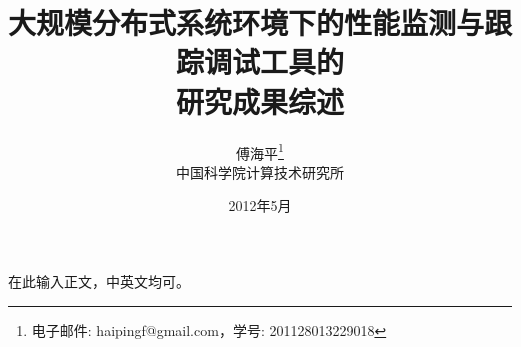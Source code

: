 ﻿\documentclass[a4paper, 11pt]{article}
\newcommand{\xiaosihao}{\fontsize{12pt}{\baselineskip}\selectfont}
\begin{document}
	\begin{CJK}{UTF8}{gbsn}
		
		\newtheorem{example}{例}             %
		\newtheorem{algorithm}{算法}
		\newtheorem{theorem}{定理}[section]  %
		\newtheorem{definition}{定义}
		\newtheorem{axiom}{公理}
		\newtheorem{property}{性质}
		\newtheorem{proposition}{命题}
		\newtheorem{lemma}{引理}
		\newtheorem{corollary}{推论}
		\newtheorem{remark}{注解}
		\newtheorem{condition}{条件}
		\newtheorem{conclusion}{结论}
		\newtheorem{assumption}{假设}
		
		\renewcommand{\contentsname}{目录}  %
		\renewcommand{\abstractname}{摘要}  %
		\renewcommand{\refname}{参考文献}   %
		\renewcommand{\indexname}{索引}
		\renewcommand{\figurename}{图}
		\renewcommand{\tablename}{表}
		\renewcommand{\appendixname}{附录}
		\renewcommand{\algorithm}{算法}
		
		
		\title{大规模分布式系统环境下的性能监测与跟踪调试工具的\\研究成果综述}
		\author{傅海平\footnote{电子邮件: haipingf@gmail.com，学号: 201128013229018}\\[2ex]
			\xiaosihao 中国科学院计算技术研究所\\[2ex]
		}
		\date{2012年5月}
		
		
		\maketitle
		\tableofcontents
		\newpage
		在此输入正文，中英文均可。
	\end{CJK}
\end{document}
